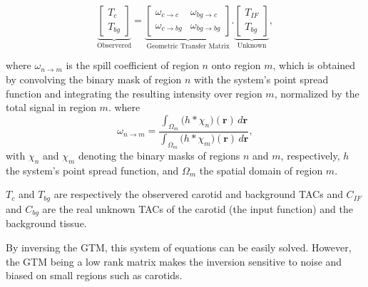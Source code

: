 \begin{equation}
	\underbrace{
		\begin{bmatrix}
			T_{c} \\
			T_{bg}
		\end{bmatrix}
	}_{\text{Observered}}
	=
	\underbrace{
		\begin{bmatrix}
			\omega_{c \rightarrow c}  & \omega_{bg \rightarrow c}  \\
			\omega_{c \rightarrow bg} & \omega_{bg \rightarrow bg}
		\end{bmatrix}
	}_{\text{Geometric Transfer Matrix}}
	.
	\underbrace{
		\begin{bmatrix}
			T_{IF} \\
			T_{bg}
		\end{bmatrix}
	}_{\text{Unknown}},
\end{equation}

where $\omega_{n \rightarrow m}$ is the spill coefficient of region $n$ onto region $m$, which is obtained by convolving the binary mask of region $n$ with the system's point spread function and integrating the resulting intensity over region $m$, normalized by the total signal in region $m$.
where
\begin{equation}
	\omega_{n\to m} = \frac{\displaystyle \int_{\Omega_m} \bigl( h \ast \chi_n \bigr)(\mathbf{r})\,d\mathbf{r}}{\displaystyle \int_{\Omega_m} \bigl( h \ast \chi_m \bigr)(\mathbf{r})\,d\mathbf{r}},
\end{equation}
with \(\chi_n\) and \(\chi_m\) denoting the binary masks of regions \(n\) and \(m\), respectively, \(h\) the system's point spread function, and \(\Omega_m\) the spatial domain of region \(m\).

$T_{c}$ and $T_{bg}$ are respectively the observered carotid and background TACs and $C_{IF}$ and $C_{bg}$ are the real unknown TACs of the carotid (the input function) and the background tissue.

By inversing the GTM, this system of equations can be easily solved. However, the GTM being a low rank matrix makes the inversion sensitive to noise and biased on small regions such as carotids.

